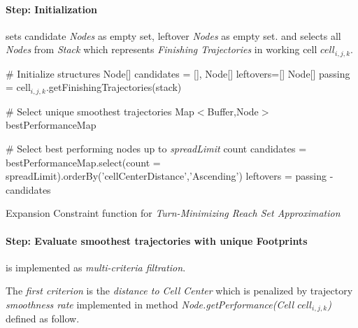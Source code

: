 \paragraph{Step: Initialization} sets candidate \emph{Nodes} as empty set, leftover \emph{Nodes} as empty set. and selects all \emph{Nodes} from \emph{Stack} which represents  \emph{Finishing Trajectories} in working cell $cell_{i,j,k}$.

\begin{algorithm}[H]
    
    \BlankLine
    \# Initialize structures\;
    Node[] candidates = [], Node[] leftovers=[]\;
    Node[] passing = cell$_{i,j,k}$.getFinishingTrajectories(stack)\;
    
    \BlankLine
    \# Select unique smoothest trajectories\;
    Map$<$Buffer,Node$>$  bestPerformanceMap\;
    \For{Node test $\in$ passing}{
        centerDistance= test.getPerformance(cell$_{i,j,k}$)]\;
        footPrint = test.getFootprint()\;
        \eIf{bestPerformanceMap.contains(footPrint)}{
            old = bestPerformanceMap.getByKey(footprint)\;
            oldPerformance= old.getPerformance(cell$_{i,j,k}$)\;
            \If{oldPerformance $>$ centerDistance}{
                bestPerformanceMap.setByKey(footprint,test)\;         
            }
        }{
            bestPerformanceMap.setByKey(footprint,test)\;
        }
    }
    
    \BlankLine
    \# Select best performing nodes up to \emph{spreadLimit} count\;
    candidates = bestPerformanceMap.select(count = spreadLimit).orderBy('cellCenterDistance','Ascending')\;
    leftovers = passing - candidates\;
    
    
    \caption{Expansion Constraint function for \emph{Turn-Minimizing Reach Set Approximation}}
    \label{alg:ExpansionConstraintFunctionForHarmonicReachSet}    
\end{algorithm}

\paragraph{Step: Evaluate smoothest trajectories with unique Footprints} is implemented as \emph{multi-criteria filtration}. 

The \emph{first criterion} is the \emph{distance to Cell Center} which is penalized by trajectory \emph{smoothness rate} implemented in method \emph{Node.getPerformance(Cell $cell_{i,j,k}$)} defined as follow.

